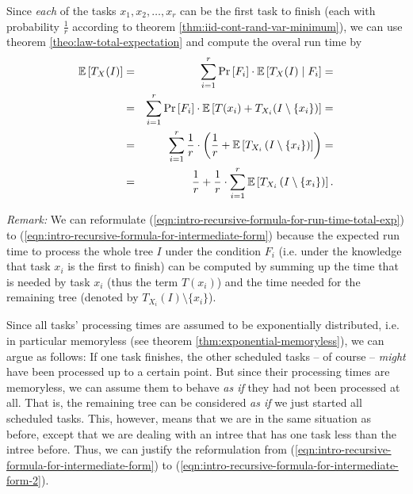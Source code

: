 \begin{itemize}
  Since \emph{each} of the tasks $x_1,x_2,\dots,x_r$ can be the first task to finish (each with probability $\frac{1}{r}$ according to theorem \ref{thm:iid-cont-rand-var-minimum}), we can use theorem \ref{theo:law-total-expectation} and compute the overal run time by 
  \begin{eqnarray}
    \label{eqn:intro-recursive-formula-for-run-time-total-exp}
    \mathbb{E}\left[ T_X(I) \right]
    &=& 
    \sum_{i=1}^r \operatorname{Pr}\left[F_i\right] \cdot \mathbb{E}\left[ T_{X} (I) \mid F_i \right]
    = \\
    &=& 
    \label{eqn:intro-recursive-formula-for-intermediate-form}
    \sum_{i=1}^r \operatorname{Pr}\left[F_i\right] \cdot \mathbb{E}\left[ T(x_i) + T_{X_i} (I \setminus \{x_i\}) \right]
    = \\
    \label{eqn:intro-recursive-formula-for-intermediate-form-2}
    &=& \sum_{i=1}^r \frac{1}{r} \cdot \left( \frac{1}{r} + \mathbb{E}\left[ T_{X_i}\left( I\setminus\left\{ x_i \right\} \right) \right] \right) = \\
    \label{eqn:intro-recursive-formula-for-run-time}
    &=&     
    \frac{1}{r} + \frac{1}{r} \cdot \sum_{i=1}^r \mathbb{E}\left[ T_{X_i}\left( I\setminus\left\{ x_i \right\} \right) \right].
  \end{eqnarray}
\end{itemize}

\emph{Remark:} We can reformulate (\ref{eqn:intro-recursive-formula-for-run-time-total-exp}) to (\ref{eqn:intro-recursive-formula-for-intermediate-form}) because the expected run time to process the whole tree $I$ under the condition $F_i$ (i.e. under the knowledge that task $x_i$ is the first to finish) can be computed by summing up the time that is needed by task $x_i$ (thus the term $T(x_i)$) and the time needed for the remaining tree (denoted by $T_{X_i}(I)\setminus\{x_i\}$).

Since all tasks' processing times are assumed to be exponentially distributed, i.e. in particular memoryless (see theorem \ref{thm:exponential-memoryless}), we can argue as follows: If one task finishes, the other scheduled tasks -- of course -- \emph{might} have been processed up to a certain point. But since their processing times are memoryless, we can assume them to behave \emph{as if} they had not been processed at all. That is, the remaining tree can be considered \emph{as if} we just started all scheduled tasks. This, however, means that we are in the same situation as before, except that we are dealing with an intree that has one task less than the intree before. Thus, we can justify the reformulation from (\ref{eqn:intro-recursive-formula-for-intermediate-form}) to (\ref{eqn:intro-recursive-formula-for-intermediate-form-2}).

